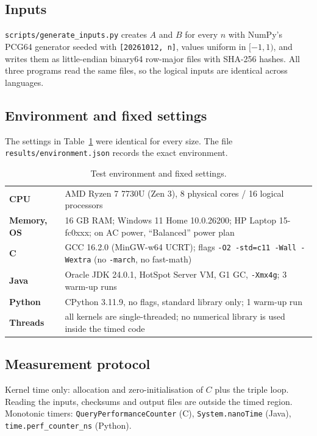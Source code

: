 \documentclass[11pt,a4paper]{article}
\newcommand{\concept}[1]{\par\addvspace{8pt}\Needspace{5\baselineskip}%
  \noindent{\color{accent}\bfseries\boldmath #1}\par\nopagebreak\vspace{2pt}}
\begin{document}
\subsection{Inputs}
\texttt{scripts/generate\_inputs.py} creates $A$ and $B$ for every $n$ with NumPy's PCG64 generator
seeded with \texttt{[20261012, n]}, values uniform in $[-1,1)$, and writes them as little-endian
binary64 row-major files with SHA-256 hashes. All three programs read the same files, so the logical
inputs are identical across languages.

\subsection{Environment and fixed settings}
The settings in Table~\ref{tab:env} were identical for every size. The file
\texttt{results/environment.json} records the exact environment.

\begin{table}[H]
\centering
\caption{Test environment and fixed settings.}
\label{tab:env}
\begin{tabularx}{\linewidth}{@{}>{\bfseries\color{accent}}l X@{}}
\toprule
CPU & AMD Ryzen 7 7730U (Zen 3), 8 physical cores / 16 logical processors \\
Memory, OS & 16 GB RAM; Windows 11 Home 10.0.26200; HP Laptop 15-fc0xxx; on AC power, ``Balanced'' power plan \\
C & GCC 16.2.0 (MinGW-w64 UCRT); flags \texttt{-O2 -std=c11 -Wall -Wextra} (no \texttt{-march}, no fast-math) \\
Java & Oracle JDK 24.0.1, HotSpot Server VM, G1 GC, \texttt{-Xmx4g}; 3 warm-up runs \\
Python & CPython 3.11.9, no flags, standard library only; 1 warm-up run \\
Threads & all kernels are single-threaded; no numerical library is used inside the timed code \\
\bottomrule
\end{tabularx}
\end{table}

\subsection{Measurement protocol}

\concept{Timing boundary}
Kernel time only: allocation and zero-initialisation of $C$ plus the triple
loop. Reading the inputs, checksums and output files are outside the timed region. Monotonic timers:
\texttt{QueryPerformanceCounter} (C), \texttt{System.nanoTime} (Java), \texttt{time.perf\_counter\_ns}
(Python).
\end{document}
